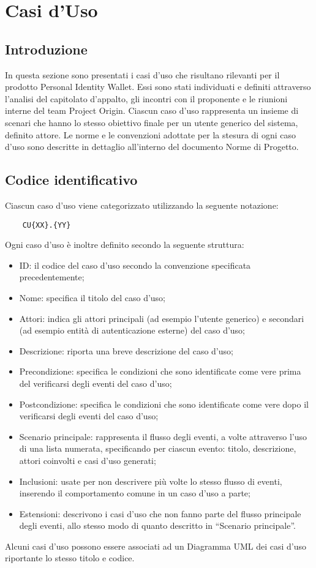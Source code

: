 \section{Casi d'Uso}
\subsection{Introduzione}
In questa sezione sono presentati i casi d'uso che risultano rilevanti per il prodotto Personal Identity Wallet. 
Essi sono stati individuati e definiti attraverso l'analisi del capitolato d'appalto, gli incontri con il proponente e le riunioni interne del team Project Origin.
 Ciascun caso d'uso rappresenta un insieme di scenari che hanno lo stesso obiettivo finale per un utente generico del sistema, definito attore.
 Le norme e le convenzioni adottate per la stesura di ogni caso d'uso sono descritte in dettaglio all'interno del documento Norme di Progetto.
 \subsection{Codice identificativo}
Ciascun caso d'uso viene categorizzato utilizzando la seguente notazione:\\ 
\begin{center}\begin{verbatim}
    CU{XX}.{YY}
\end{verbatim}\end{center}
Ogni caso d’uso è inoltre definito secondo la seguente struttura:
\begin{itemize}
    \item ID: il codice del caso d’uso secondo la convenzione specificata precedentemente;
    \item Nome:  specifica il titolo del caso d’uso;
    \item Attori:  indica gli attori principali (ad esempio l’utente generico) e secondari (ad esempio entità di autenticazione esterne) del caso d’uso;
    \item Descrizione:  riporta una breve descrizione del caso d’uso;
    \item Precondizione:  specifica le condizioni che sono identificate come vere prima del verificarsi degli eventi del caso d’uso;
    \item Postcondizione:  specifica  le  condizioni  che  sono  identificate  come  vere  dopo  il verificarsi degli eventi del caso d’uso;
    \item Scenario  principale:  rappresenta  il  flusso  degli  eventi,  a  volte  attraverso  l'uso di  una  lista  numerata,  specificando  per  ciascun  evento:  titolo,  descrizione,  attori coinvolti e casi d’uso generati;
    \item Inclusioni:  usate per non descrivere più volte lo stesso flusso di eventi, inserendo il comportamento comune in un caso d’uso a parte;
    \item Estensioni:  descrivono i casi d’uso che non fanno parte del flusso principale degli eventi, allo stesso modo di quanto descritto in “Scenario principale”.
\end{itemize}
Alcuni  casi  d’uso  possono  essere  associati  ad  un Diagramma UML  dei  casi  d'uso riportante lo stesso titolo e codice.
